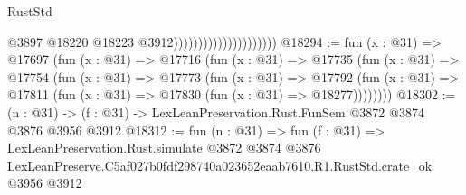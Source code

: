 \begin{lexlean}{RustStd}
\begin{coremodule}
                                              @3897
                                              @18220
                                              @18223
                                              @3912)))))))))))))))))))))
@18294 := fun (x : @31) =>
  @17697
    (fun (x : @31) =>
    @17716
      (fun (x : @31) =>
      @17735
        (fun (x : @31) =>
        @17754
          (fun (x : @31) =>
          @17773
            (fun (x : @31) =>
            @17792
              (fun (x : @31) => @17811 (fun (x : @31) => @17830 (fun (x : @31) => @18277))))))))
@18302 := (n : @31) -> (f : @31) -> LexLeanPreservation.Rust.FunSem @3872 @3874 @3876 @3956 @3912
@18312 := fun (n : @31) =>
  fun (f : @31) =>
  LexLeanPreservation.Rust.simulate
    @3872
    @3874
    @3876
    LexLeanPreserve.C5af027b0fdf298740a023652eaab7610.R1.RustStd.crate_ok
    @3956
    @3912
\end{coremodule}
\end{lexlean}
